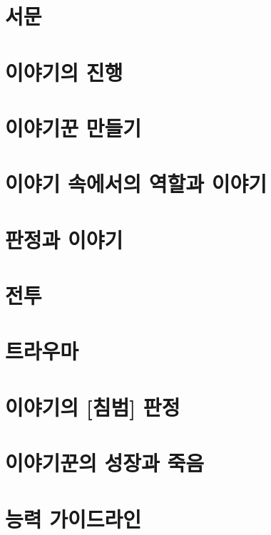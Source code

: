 \documentclass{report}
\begin{document}
	\parttoc
	
	\chapter{서문}
	
	
	\chapter{이야기의 진행}
	
	
	\chapter{이야기꾼 만들기}
	
	
	\chapter{이야기 속에서의 역할과 이야기}
	
	
	\chapter{판정과 이야기}
	
	
	\chapter{전투}
	
	
	\chapter{트라우마}\label{트라우마}
	
	
	\chapter{이야기의 [침범] 판정}\label{침범_판정}
	
	
	\chapter{이야기꾼의 성장과 죽음}\label{성장}
	
	
	\chapter{능력 가이드라인}\label{능력_가이드라인}
	
	
\end{document}
